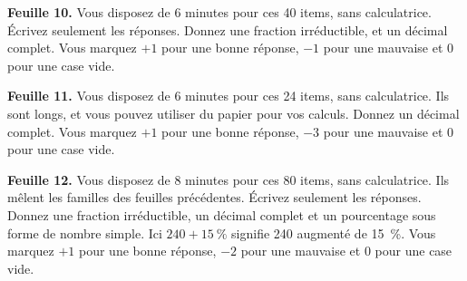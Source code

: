 \begin{question}\label{iq:iv1:speed-drills:10}
\textbf{Feuille 10.} Vous disposez de 6 minutes pour ces 40 items, sans calculatrice. Écrivez seulement les réponses. Donnez une fraction irréductible, et un décimal complet. Vous marquez $+1$ pour une bonne réponse, $-1$ pour une mauvaise et 0 pour une case vide.

\end{question}
\clearpage

\begin{question}\label{iq:iv1:speed-drills:11}
\textbf{Feuille 11.} Vous disposez de 6 minutes pour ces 24 items, sans calculatrice. Ils sont longs, et vous pouvez utiliser du papier pour vos calculs. Donnez un décimal complet. Vous marquez $+1$ pour une bonne réponse, $-3$ pour une mauvaise et 0 pour une case vide.

\end{question}
\clearpage

\begin{question}\label{iq:iv1:speed-drills:12}
\textbf{Feuille 12.} Vous disposez de 8 minutes pour ces 80 items, sans calculatrice. Ils mêlent les familles des feuilles précédentes. Écrivez seulement les réponses. Donnez une fraction irréductible, un décimal complet et un pourcentage sous forme de nombre simple. Ici $240 + 15~\%$ signifie 240 augmenté de 15~\%. Vous marquez $+1$ pour une bonne réponse, $-2$ pour une mauvaise et 0 pour une case vide.

\end{question}
